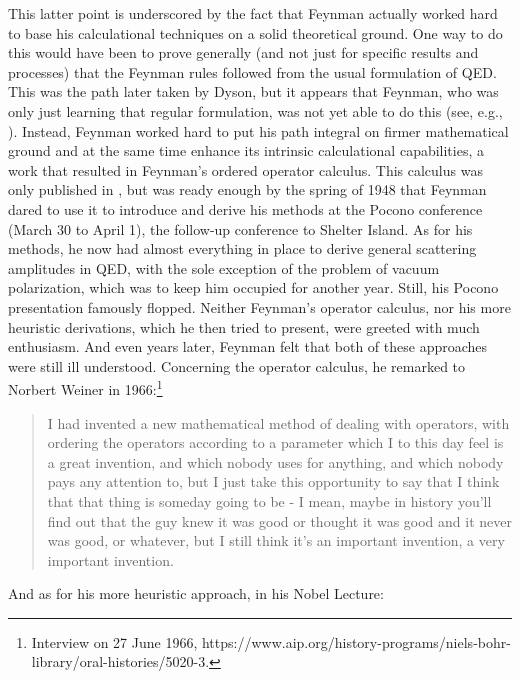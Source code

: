 \documentclass[12pt,a4paper]{article}
\begin{document}
This latter point is underscored by the fact that Feynman actually worked hard to base his calculational techniques on a solid theoretical ground. One way to do this would have been to prove generally (and not just for specific results and processes) that the Feynman rules followed from the usual formulation of QED. This was the path later taken by Dyson, but it appears that Feynman, who was only just learning that regular formulation, was not yet able to do this (see, e.g., \citep[p. 144]{wuethrich_2010_the-genesis}).  Instead, Feynman worked hard to put his path integral on firmer mathematical ground and at the same time enhance its intrinsic calculational capabilities, a work that resulted in Feynman's ordered operator calculus. This calculus was only published in \citep{feynman_1951_an-operator}, but was ready enough by the spring of 1948 that Feynman dared to use it to introduce and derive his methods at the Pocono conference (March 30 to April 1), the follow-up conference to Shelter Island. As for his methods, he now had almost everything in place to derive general scattering amplitudes in QED, with the sole exception of the problem of vacuum polarization, which was to keep him occupied for another year. Still, his Pocono presentation famously flopped. Neither Feynman's operator calculus, nor his more heuristic derivations, which he then tried to present, were greeted with much enthusiasm. And even years later, Feynman felt that both of these approaches were still ill understood. Concerning the operator calculus, he remarked to Norbert Weiner in 1966:\footnote{Interview on 27 June 1966, https://www.aip.org/history-programs/niels-bohr-library/oral-histories/5020-3.}

\begin{quote}
I had invented a new mathematical method of dealing with operators, with ordering the operators according to a parameter which I to this day feel is a great invention, and which nobody uses for anything, and which nobody pays any attention to, but I just take this opportunity to say that I think that that thing is someday going to be - I mean, maybe in history you'll find out that the guy knew it was good or thought it was good and it never was good, or whatever, but I still think it's an important invention, a very important invention.
\end{quote}

And as for his more heuristic approach, in his Nobel Lecture:
\end{document}
